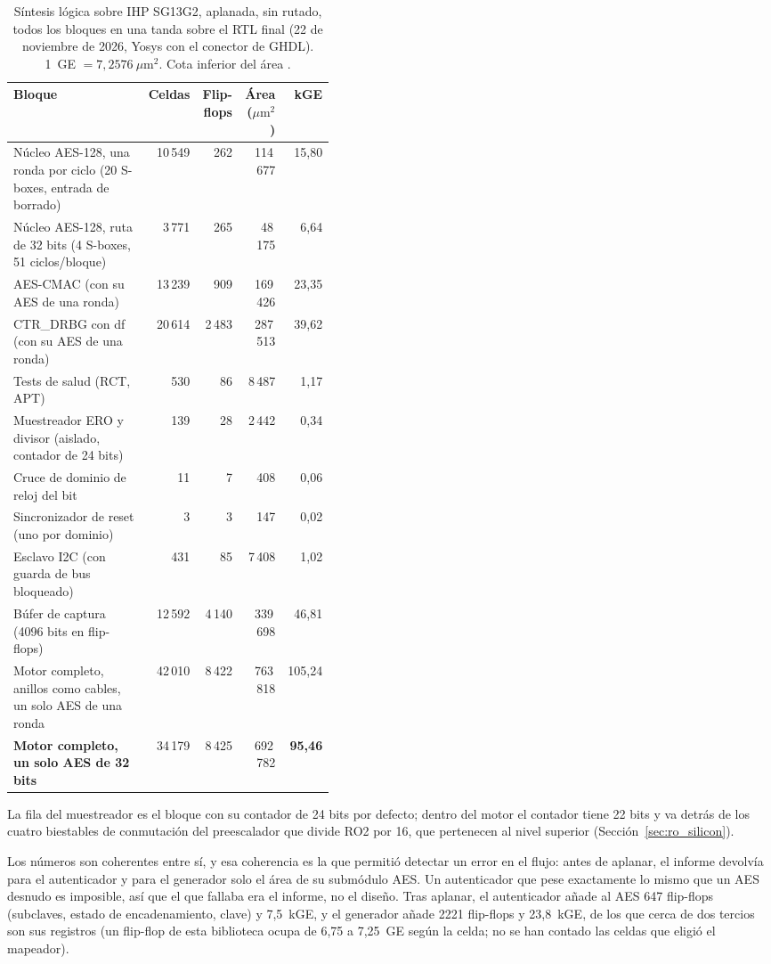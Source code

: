 \begin{table}[htbp]
\centering
\caption{Síntesis lógica sobre IHP SG13G2, aplanada, sin rutado, todos
los bloques en una tanda sobre el \ac{RTL} final (22 de noviembre de
2026, Yosys con el conector de GHDL). 1~GE $=7{,}2576~\mu\mathrm{m}^2$.
Cota inferior del área \simu{}.}
\label{tab:synth}
\begin{tabular}{@{}>{\raggedright\arraybackslash}p{0.42\linewidth}rrrr@{}}
\toprule
Bloque & Celdas & Flip-flops & Área ($\mu\mathrm{m}^2$) & kGE \\
\midrule
Núcleo AES-128, una ronda por ciclo (20 S-boxes, entrada de borrado) & 10\,549 & 262 & 114\,677 & 15,80 \\
Núcleo AES-128, ruta de 32 bits (4 S-boxes, 51 ciclos/bloque) & 3\,771 & 265 & 48\,175 & 6,64 \\
AES-CMAC (con su AES de una ronda) & 13\,239 & 909   & 169\,426 & 23,35 \\
CTR\_DRBG con df (con su AES de una ronda) & 20\,614 & 2\,483 & 287\,513 & 39,62 \\
Tests de salud (RCT, APT)      & 530     & 86    & 8\,487   & 1,17 \\
Muestreador ERO y divisor (aislado, contador de 24 bits) & 139 & 28 & 2\,442 & 0,34 \\
Cruce de dominio de reloj del bit & 11   & 7     & 408      & 0,06 \\
Sincronizador de reset (uno por dominio) & 3 & 3 & 147      & 0,02 \\
Esclavo I2C (con guarda de bus bloqueado) & 431 & 85 & 7\,408 & 1,02 \\
\midrule
Búfer de captura (4096 bits en flip-flops) & 12\,592 & 4\,140 & 339\,698 & 46,81 \\
Motor completo, anillos como cables, un solo AES de una ronda & 42\,010 & 8\,422 & 763\,818 & 105,24 \\
\textbf{Motor completo, un solo AES de 32 bits} & 34\,179 & 8\,425 & 692\,782 & \textbf{95,46} \\
\bottomrule
\end{tabular}
\end{table}

La fila del muestreador es el bloque con su contador de 24 bits por
defecto; dentro del motor el contador tiene 22 bits y va detrás de los
cuatro biestables de conmutación del preescalador que divide RO2 por 16,
que pertenecen al nivel superior (Sección~\ref{sec:ro_silicon}).

Los números son coherentes entre sí, y esa coherencia es la que permitió
detectar un error en el flujo: antes de aplanar, el informe devolvía para el
autenticador y para el generador solo el área de su submódulo AES. Un
autenticador que pese exactamente lo mismo que un AES desnudo es imposible,
así que el que fallaba era el informe, no el diseño. Tras aplanar, el
autenticador añade al AES 647 flip-flops (subclaves, estado de
encadenamiento, clave) y 7,5~kGE, y el generador añade 2221 flip-flops y
23,8~kGE, de los que cerca de dos tercios son sus registros \est{} (un
flip-flop de esta biblioteca ocupa de 6,75 a 7,25~GE según la celda; no
se han contado las celdas que eligió el mapeador).

